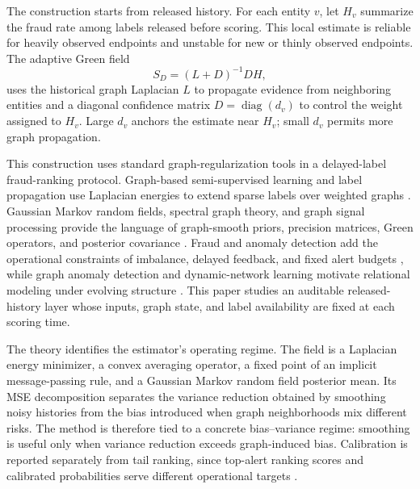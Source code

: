 \documentclass[11pt]{article}
\theoremstyle{definition}
\theoremstyle{remark}
\newcommand{\diag}{\operatorname{diag}}
\begin{document}
The construction starts from released history. For each entity $v$, let $H_v$ summarize the fraud rate among labels released before scoring. This local estimate is reliable for heavily observed endpoints and unstable for new or thinly observed endpoints. The adaptive Green field
\begin{equation}
        S_D=(L+D)^{-1}DH,
        \label{eq:main-field}
\end{equation}
uses the historical graph Laplacian $L$ to propagate evidence from neighboring entities and a diagonal confidence matrix $D=\diag(d_v)$ to control the weight assigned to $H_v$. Large $d_v$ anchors the estimate near $H_v$; small $d_v$ permits more graph propagation.

This construction uses standard graph-regularization tools in a delayed-label fraud-ranking protocol. Graph-based semi-supervised learning and label propagation use Laplacian energies to extend sparse labels over weighted graphs \cite{zhu2003,zhou2004,belkin2006,smola2003,chapelle2006}. Gaussian Markov random fields, spectral graph theory, and graph signal processing provide the language of graph-smooth priors, precision matrices, Green operators, and posterior covariance \cite{rueheld,chung1997,rasmussen2006,shuman2013,ortega2018}. Fraud and anomaly detection add the operational constraints of imbalance, delayed feedback, and fixed alert budgets \cite{boltonhand2002,phua2010,davis2006relationship,saito2015precision}, while graph anomaly detection and dynamic-network learning motivate relational modeling under evolving structure \cite{akoglu2015,ranshous2015,weber2019,elmougy2023,kipf2017,hamilton2017,velickovic2018,pareja2020,sankar2020,xu2020,rossi2020}. This paper studies an auditable released-history layer whose inputs, graph state, and label availability are fixed at each scoring time.

The theory identifies the estimator's operating regime. The field is a Laplacian energy minimizer, a convex averaging operator, a fixed point of an implicit message-passing rule, and a Gaussian Markov random field posterior mean. Its MSE decomposition separates the variance reduction obtained by smoothing noisy histories from the bias introduced when graph neighborhoods mix different risks. The method is therefore tied to a concrete bias--variance regime: smoothing is useful only when variance reduction exceeds graph-induced bias. Calibration is reported separately from tail ranking, since top-alert ranking scores and calibrated probabilities serve different operational targets \cite{zadrozny2002,niculescu2005,guo2017}.
\end{document}
